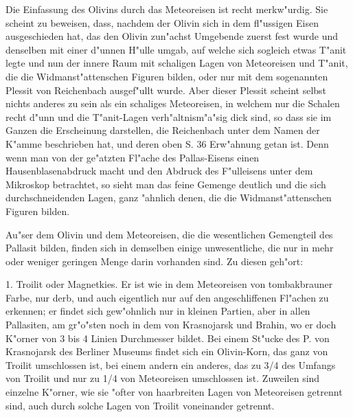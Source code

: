 \documentclass[a4paper, 11pt, oneside]{article}
\begin{document}
Die Einfassung des Olivins durch das Meteoreisen ist recht merkw"urdig. Sie scheint zu beweisen, dass, nachdem der Olivin sich in dem fl"ussigen Eisen ausgeschieden hat, das den Olivin zun"achst Umgebende zuerst fest wurde und denselben mit einer d"unnen H"ulle umgab, auf welche sich sogleich etwas T"anit legte und nun der innere Raum mit schaligen Lagen von Meteoreisen und T"anit, die die Widmanst"attenschen Figuren bilden, oder nur mit dem sogenannten Plessit von Reichenbach ausgef"ullt wurde. Aber dieser Plessit scheint selbst nichts anderes zu sein als ein schaliges Meteoreisen, in welchem nur die Schalen recht d"unn und die T"anit-Lagen verh"altnism"a"sig dick sind, so dass sie im Ganzen die Erscheinung darstellen, die Reichenbach unter dem Namen der K"amme beschrieben hat, und deren oben S. 36 Erw"ahnung getan ist. Denn wenn man von der ge"atzten Fl"ache des Pallas-Eisens einen Hausenblasenabdruck macht und den Abdruck des F"ulleisens unter dem Mikroskop betrachtet, so sieht man das feine Gemenge deutlich und die sich durchschneidenden Lagen, ganz "ahnlich denen, die die Widmanst"attenschen Figuren bilden.

Au"ser dem Olivin und dem Meteoreisen, die die wesentlichen Gemengteil des Pallasit bilden, finden sich in demselben einige unwesentliche, die nur in mehr oder weniger geringen Menge darin vorhanden sind. Zu diesen geh"ort:

1. Troilit oder Magnetkies. Er ist wie in dem Meteoreisen von tombakbrauner Farbe, nur derb, und auch eigentlich nur auf den angeschliffenen Fl"achen zu erkennen; er findet sich gew"ohnlich nur in kleinen Partien, aber in allen Pallasiten, am gr"o"sten noch in dem von Krasnojarsk und Brahin, wo er doch K"orner von 3 bis 4 Linien Durchmesser bildet. Bei einem St"ucke des P. von Krasnojarsk des Berliner Museums findet sich ein Olivin-Korn, das ganz von Troilit umschlossen ist, bei einem andern ein anderes, das zu 3/4 des Umfangs von Troilit und nur zu 1/4 von Meteoreisen umschlossen ist. Zuweilen sind einzelne K"orner, wie sie "ofter von haarbreiten Lagen von Meteoreisen getrennt sind, auch durch solche Lagen von Troilit voneinander getrennt.
\end{document}
